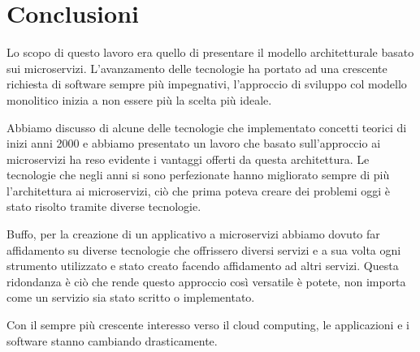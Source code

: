 \chapter{Conclusioni}
Lo scopo di questo lavoro era quello di presentare il modello architetturale basato sui microservizi. L'avanzamento delle tecnologie ha portato ad una crescente richiesta di software sempre più impegnativi, l'approccio di sviluppo col modello monolitico inizia a non essere più la scelta più ideale.

Abbiamo discusso di alcune delle tecnologie che implementato concetti teorici di inizi anni 2000 e abbiamo presentato un lavoro che basato sull'approccio ai microservizi ha reso evidente i vantaggi offerti da questa architettura. Le tecnologie che negli anni si sono perfezionate hanno migliorato sempre di più l'architettura ai microservizi, ciò che prima poteva creare dei problemi oggi è stato risolto tramite diverse tecnologie.

Buffo, per la creazione di un applicativo a microservizi abbiamo dovuto far affidamento su diverse tecnologie che offrissero diversi servizi e a sua volta ogni strumento utilizzato e stato creato facendo affidamento ad altri servizi. Questa ridondanza è ciò che rende questo approccio così versatile è potete, non importa come un servizio sia stato scritto o implementato.

Con il sempre più crescente interesso verso il cloud computing, le applicazioni e i software stanno cambiando drasticamente.

